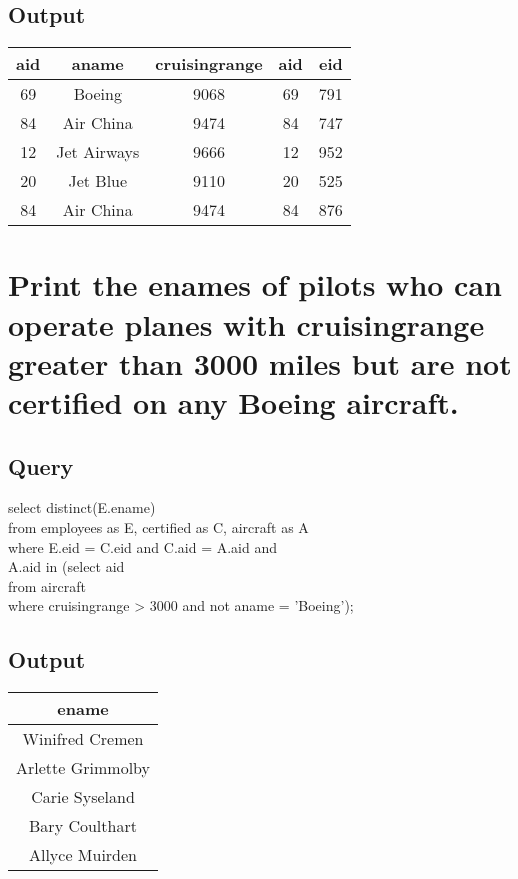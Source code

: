 \documentclass[11pt]{scrartcl} %
\begin{document}
\subsection{Output}
\begin{left}
\begin{tabular}{ |c| c| c|c|c| }
\hline
\textbf{aid} & \textbf{aname} & \textbf{cruisingrange}& \textbf{aid}& \textbf{eid}\\
\hline
69 & Boeing & 9068 & 69 &	791\\
84&	Air China&	9474&	84&	747\\
12&	Jet Airways&	9666&	12&	952\\
20&	Jet Blue&	9110&	20&	525\\
84&	Air China&	9474&	84&	876\\
\hline

\end{tabular}
\end{left}




\section{Print the enames of pilots who can operate planes with cruisingrange  greater than 3000 miles but are not certified on any Boeing aircraft. }

\subsection{Query}
select distinct(E.ename)\\
from employees as E, certified as C, aircraft as A\\
where E.eid = C.eid and C.aid = A.aid and\\
\hspace*{10mm} 	A.aid in (select aid \\
\hspace*{10mm}from aircraft \\
\hspace*{10mm}where cruisingrange > 3000 and not aname = 'Boeing');

\subsection{Output}
\begin{left}
\begin{tabular}{ | c | }
\hline
\textbf{ename} \\
\hline
Winifred Cremen\\
Arlette Grimmolby\\
Carie Syseland\\
Bary Coulthart\\
Allyce Muirden \\


\hline

\end{tabular}
\end{left}
\end{document}
